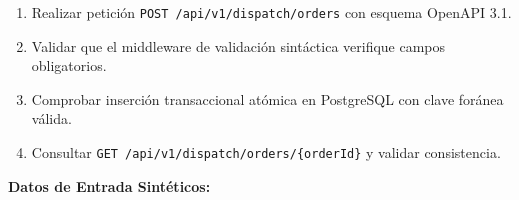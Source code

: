 \begin{enumerate}
\item Realizar petición \texttt{P\allowbreak{}O\allowbreak{}S\allowbreak{}T\allowbreak{} /\allowbreak{}a\allowbreak{}p\allowbreak{}i\allowbreak{}/\allowbreak{}v\allowbreak{}1\allowbreak{}/\allowbreak{}d\allowbreak{}i\allowbreak{}s\allowbreak{}p\allowbreak{}a\allowbreak{}t\allowbreak{}c\allowbreak{}h\allowbreak{}/\allowbreak{}o\allowbreak{}r\allowbreak{}d\allowbreak{}e\allowbreak{}r\allowbreak{}s\allowbreak{}} con esquema OpenAPI 3.1.
\item Validar que el middleware de validación sintáctica verifique campos obligatorios.
\item Comprobar inserción transaccional atómica en PostgreSQL con clave foránea válida.
\item Consultar \texttt{G\allowbreak{}E\allowbreak{}T\allowbreak{} /\allowbreak{}a\allowbreak{}p\allowbreak{}i\allowbreak{}/\allowbreak{}v\allowbreak{}1\allowbreak{}/\allowbreak{}d\allowbreak{}i\allowbreak{}s\allowbreak{}p\allowbreak{}a\allowbreak{}t\allowbreak{}c\allowbreak{}h\allowbreak{}/\allowbreak{}o\allowbreak{}r\allowbreak{}d\allowbreak{}e\allowbreak{}r\allowbreak{}s\allowbreak{}/\allowbreak{}\{\allowbreak{}o\allowbreak{}r\allowbreak{}d\allowbreak{}e\allowbreak{}r\allowbreak{}I\allowbreak{}d\allowbreak{}\}\allowbreak{}} y validar consistencia.
\end{enumerate}
\par\noindent\textbf{Datos de Entrada Sintéticos:} \par
